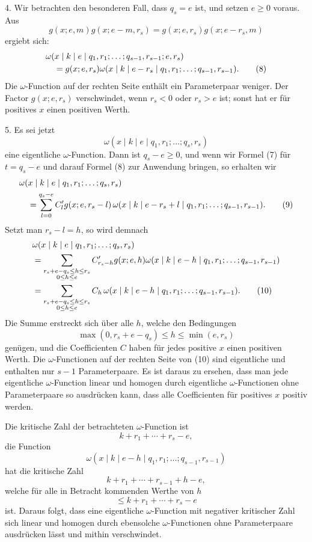 \documentclass[11pt,a4paper]{article}
\begin{document}
4. Wir betrachten den besonderen Fall, dass $q_s=e$ ist, und setzen $e\ge0$ voraus. Aus
\[
 g(x;e,m)g(x;e-m,r_s)=g(x;e,r_s)g(x;e-r_s,m)
\]
ergiebt sich:
\begin{align}
&\omega(x\mid k\mid e\mid q_1,r_1;\ldots;q_{s-1},r_{s-1};e,r_s)\notag\\
&\quad=g(x;e,r_s)\omega(x\mid k\mid e-r_s\mid q_1,r_1;\ldots;q_{s-1},r_{s-1}).
\tag{8}
\end{align}
Die $\omega$-Function auf der rechten Seite enthält ein Parameterpaar weniger. Der Factor $g(x;e,r_s)$ verschwindet, wenn $r_s<0$ oder $r_s>e$ ist; sonst hat er für positives $x$ einen positiven Werth.

5. Es sei jetzt
\[
 \omega(x\mid k\mid e\mid q_1,r_1;\ldots;q_s,r_s)
\]
eine eigentliche $\omega$-Function. Dann ist $q_s-e\ge0$, und wenn wir Formel (7) für $t=q_s-e$ und darauf Formel (8) zur Anwendung bringen, so erhalten wir
\begin{align}
&\omega(x\mid k\mid e\mid q_1,r_1;\ldots;q_s,r_s)\notag\\
&\quad=\sum_{l=0}^{q_s-e}C'_l g(x;e,r_s-l)\,
 \omega(x\mid k\mid e-r_s+l\mid q_1,r_1;\ldots;q_{s-1},r_{s-1}).
\tag{9}
\end{align}
Setzt man $r_s-l=h$, so wird demnach
\begin{align}
&\omega(x\mid k\mid e\mid q_1,r_1;\ldots;q_s,r_s)\notag\\
&=\sum_{\substack{r_s+e-q_s\le h\le r_s\\0\le h\le e}}
 C'_{r_s-h}g(x;e,h)\omega(x\mid k\mid e-h\mid q_1,r_1;\ldots;q_{s-1},r_{s-1})\notag\\
&=\sum_{\substack{r_s+e-q_s\le h\le r_s\\0\le h\le e}}
 C_h\,\omega(x\mid k\mid e-h\mid q_1,r_1;\ldots;q_{s-1},r_{s-1}).
\tag{10}
\end{align}
Die Summe erstreckt sich über alle $h$, welche den Bedingungen
\[
 \max(0,r_s+e-q_s)\le h\le \min(e,r_s)
\]
genügen, und die Coefficienten $C$ haben für jedes positive $x$ einen positiven Werth. Die $\omega$-Functionen auf der rechten Seite von (10) sind eigentliche und enthalten nur $s-1$ Parameterpaare. Es ist daraus zu ersehen, dass man jede eigentliche $\omega$-Function linear und homogen durch eigentliche $\omega$-Functionen ohne Parameterpaare so ausdrücken kann, dass alle Coefficienten für positives $x$ positiv werden.

Die kritische Zahl der betrachteten $\omega$-Function ist
\[
 k+r_1+\cdots+r_s-e,
\]
die Function
\[
 \omega(x\mid k\mid e-h\mid q_1,r_1;\ldots;q_{s-1},r_{s-1})
\]
hat die kritische Zahl
\[
 k+r_1+\cdots+r_{s-1}+h-e,
\]
welche für alle in Betracht kommenden Werthe von $h$
\[
 \le k+r_1+\cdots+r_s-e
\]
ist. Daraus folgt, dass eine eigentliche $\omega$-Function mit negativer kritischer Zahl sich linear und homogen durch ebensolche $\omega$-Functionen ohne Parameterpaare ausdrücken lässt und mithin verschwindet.
\end{document}

